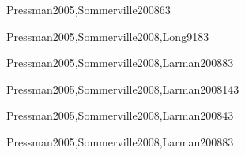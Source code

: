 \begin{syllabus}
\begin{unit}{\SEUsingAPIsDef}{Pressman2005,Sommerville2008}{6}{3}
   \SEUsingAPIsAllTopics
   \SEUsingAPIsAllObjectives
\end{unit}

\begin{unit}{\SEToolsAndEnvironmentsDef}{Pressman2005,Sommerville2008,Long91}{8}{3}
    \SEToolsAndEnvironmentsAllTopics
    \SEToolsAndEnvironmentsAllObjectives
\end{unit}

\begin{unit}{\SESoftwareValidationDef}{Pressman2005,Sommerville2008,Larman2008}{8}{3}
    \SESoftwareValidationAllTopics
    \SESoftwareValidationAllObjectives
\end{unit}

\begin{unit}{\SEComponentBasedComputingDef}{Pressman2005,Sommerville2008,Larman2008}{14}{3}
    \SEComponentBasedComputingAllTopics
    \SEComponentBasedComputingAllObjectives
\end{unit}

\begin{unit}{\SESpecializedSystemsDef}{Pressman2005,Sommerville2008,Larman2008}{4}{3}
    \SESpecializedSystemsAllTopics
    \SESpecializedSystemsAllObjectives
\end{unit}

\begin{unit}{\SERobustAndSecurityDef}{Pressman2005,Sommerville2008,Larman2008}{8}{3}
    \SERobustAndSecurityAllTopics
    \SERobustAndSecurityAllObjectives
\end{unit}



\begin{coursebibliography}
\end{coursebibliography}

\end{syllabus}
